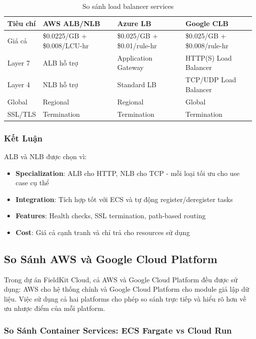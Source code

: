 \begin{table}[H]
\centering
\caption{So sánh load balancer services}
\label{tab:so-sanh-lb}
\begin{tabular}{|p{2.5cm}|p{3.5cm}|p{3.5cm}|p{3.5cm}|}
\hline
\textbf{Tiêu chí} & \textbf{AWS ALB/NLB} & \textbf{Azure LB} & \textbf{Google CLB} \\
\hline
Giá cả & \$0.0225/GB + \$0.008/LCU-hr & \$0.025/GB + \$0.01/rule-hr & \$0.025/GB + \$0.008/rule-hr \\
\hline
Layer 7 & ALB hỗ trợ & Application Gateway & HTTP(S) Load Balancer \\
\hline
Layer 4 & NLB hỗ trợ & Standard LB & TCP/UDP Load Balancer \\
\hline
Global & Regional & Regional & Global \\
\hline
SSL/TLS & Termination & Termination & Termination \\
\hline
\end{tabular}
\end{table}

\subsubsection{Kết Luận}

ALB và NLB được chọn vì:
\begin{itemize}
    \item \textbf{Specialization}: ALB cho HTTP, NLB cho TCP - mỗi loại tối ưu cho use case cụ thể
    \item \textbf{Integration}: Tích hợp tốt với ECS và tự động register/deregister tasks
    \item \textbf{Features}: Health checks, SSL termination, path-based routing
    \item \textbf{Cost}: Giá cả cạnh tranh và chỉ trả cho resources sử dụng
\end{itemize}

\subsection{So Sánh AWS và Google Cloud Platform}

Trong dự án FieldKit Cloud, cả AWS và Google Cloud Platform đều được sử dụng: AWS cho hệ thống chính và Google Cloud Platform cho module giả lập dữ liệu. Việc sử dụng cả hai platforms cho phép so sánh trực tiếp và hiểu rõ hơn về ưu nhược điểm của mỗi platform.

\subsubsection{So Sánh Container Services: ECS Fargate vs Cloud Run}

